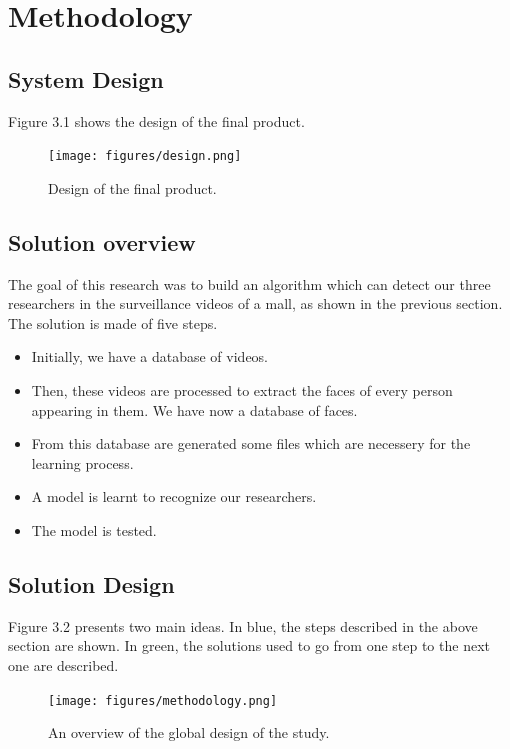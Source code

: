 \setlength{\footskip}{8mm}

\chapter{Methodology}
\label{ch:methodology}

\section{System Design}
Figure 3.1 shows the design of the final product. 
\begin{figure}[!ht]
  \centering
  \texttt{[image: figures/design.png]}  
  \caption[Design of the final product.]{Design of the final product.}
  \label{fig:Design}
\end{figure}
\FloatBarrier

\section{Solution overview}

The goal of this research was to build an algorithm which can detect our three researchers in the surveillance videos of a mall, as shown in the previous section. The solution is made of five steps.
\begin{itemize}
\item Initially, we have a database of videos.\newline
\item Then, these videos are processed to extract the faces of every person appearing in them. We have now a database of faces.\newline
\item From this database are generated some files which are necessery for the learning process.\newline
\item A model is learnt to recognize our researchers.\newline
\item The model is tested.
\end{itemize}

\section{Solution Design}

Figure 3.2 presents two main ideas. In blue, the steps described in the above section are shown. In green, the solutions used to go from one step to the next one are described.\newline
\begin{figure}[!ht]
  \centering
  \texttt{[image: figures/methodology.png]}  
  \caption[An overview of the global design of the study.]{An overview of the global design of the study.}
  \label{fig:Methodology}
\end{figure}
\FloatBarrier

